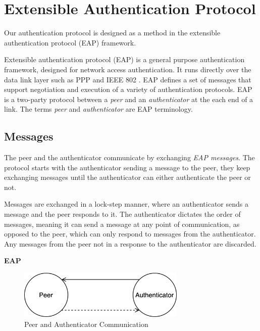 \section{Extensible Authentication Protocol}
\label{section:eap}
Our authentication protocol is designed as a method in the extensible authentication protocol (EAP) framework.


Extensible authentication protocol \cite{aboba2004extensible} (EAP) is a general purpose authentication framework, designed for network access authentication. 
It runs directly over the data link layer such as PPP  \cite{simpson1994rfc1661} and IEEE 802 \cite{walke2007ieee}.
EAP defines a set of messages that support negotiation and execution of a variety of authentication protocols.
EAP is a two-party protocol between a \textit{peer} and an \textit{authenticator} at the each end of a link. The terms \textit{peer} and \textit{authenticator} are EAP terminology.

\subsection{Messages}
The peer and the authenticator communicate by exchanging \textit{EAP messages}.
The protocol starts with the authenticator sending a message to the peer, they keep exchanging messages until the authenticator can either authenticate the peer or not.

Messages are exchanged in a lock-step manner, where an authenticator sends a message and the peer responds to it. 
The authenticator dictates the order of messages, meaning it can send a message at any point of communication, as opposed to the peer, which can only respond to messages from the authenticator.
Any messages from the peer not in a response to the authenticator are discarded.
\bigskip
\begin{center}
	\textbf{EAP}
\end{center}
\begin{figure}[h]
	\centering
	\includegraphics[width=8cm]{images/eap-messages}
	\caption{Peer and Authenticator Communication}
	\label{fig:eap-messages}
\end{figure}

